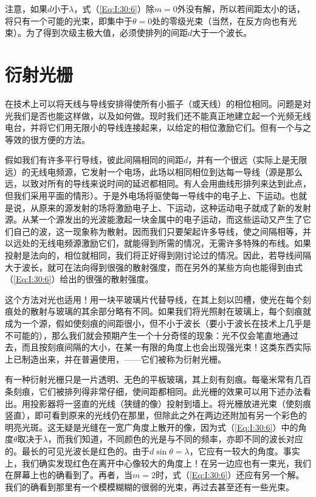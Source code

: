 注意，如果$d$小于$\lambda$，式（\ref{Eq:I:30:6}）除$m=0$外没有解，所以若间距太小的话，将只有一个可能的光束，即集中于$\theta=0$处的零级光束（当然，在反方向也有光束）。为了得到次级主极大值，必须使排列的间距$d$大于一个波长。

\section{衍射光栅}

在技术上可以将天线与导线安排得使所有小振子（或天线）的相位相同。问题是对光我们是否也能这样做，以及如何做。现时我们还不能真正地建立起一个光频无线电台，并将它们用无限小的导线连接起来，以给定的相位激励它们。但有一个与之等效的很方便的方法。

假如我们有许多平行导线，彼此间隔相同的间距$d$，并有一个很远（实际上是无限远）的无线电频源，它发射一个电场，此场以相同相位到达每一导线（源是那么远，以致对所有的导线来说时间的延迟都相同。有人会用曲线形排列来达到此点，但我们采用平面的情形）。于是外电场将驱使每一导线中的电子上、下运动。也就是说，从原来的源发射的场将激励电子上、下运动，这种运动电子就成了新的发射源。从某一个源发出的光波能激起一块金属中的电子运动，而这些运动又产生了它们自己的波，这一现象称为散射。因而我们只要架起许多导线，使之间隔相等，并以远处的无线电频源激励它们，就能得到所需的情况，无需许多特殊的布线。如果投射是法向的，相位就相同，我们将正好得到刚讨论过的情况。因此，若导线间隔大于波长，就可在法向得到很强的散射强度，而在另外的某些方向也能得到由式（\ref{Eq:I:30:6}）给出的很强的散射强度。

这个方法对光也适用！用一块平玻璃片代替导线，在其上刻以凹槽，使光在每个刻痕处的散射与玻璃的其余部分略有不同。如果我们将光照射在玻璃上，每个刻痕就成为一个源，假如使刻痕的间距很小，但不小于波长（要小于波长在技术上几乎是不可能的），那么我们就会预期产生一个十分奇怪的现象：光不仅会笔直地通过去，而且按刻痕间隔的大小，在某一有限的角度上也会出现强光束！这类东西实际上已制造出来，并在普遍使用，——它们被称为衍射光栅。

有一种衍射光栅只是一片透明、无色的平板玻璃，其上刻有刻痕。每毫米常有几百条刻痕，它们被排列得非常仔细，使间距都相同。此光栅的效果可以用下述办法看出。用投影器将一竖直的光线（狭缝的像）投射到墙上。将光栅放进光束（使刻痕竖直），即可看到原来的光线仍在那里，但除此之外在两边还附加有另一个彩色的明亮光斑。这无疑是光缝在一宽广角度上散开的像，因为式（\ref{Eq:I:30:6}）中的角度$\theta$取决于$\lambda$，而我们知道，不同颜色的光是与不同的频率，亦即不同的波长对应的。最长的可见光波长是红色的。由于$d\sin\theta=\lambda$，它应有一较大的角度。事实上，我们确实发现红色在离开中心像较大的角度上！在另一边应也有一束光，我们在屏幕上也的确看到了。再者，当$m=2$时，式（\ref{Eq:I:30:6}）还应有另一个解。我们的确看到那里有一个模模糊糊的很弱的光束，再过去甚至还有一些光束。

